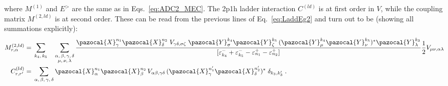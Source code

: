 where $M^{(1)}$ and $E^>$ are the same as in Eqs.~\eqref{eq:ADC2_MEC}. The 2p1h ladder interaction $C^{(ld)}$ is at first order in $V$, while the coupling matrix $ M^{(2,ld)}$ is at second order. These can be read from the previous lines of Eq.~\eqref{eq:LaddEg2} and turn out to be (showing all summations explicitly):
\begin{align}
M^{(2,ld)}_{r,\alpha} ={}&  \sum_{k_4, \, k_5} \quad \sum_{\substack{ \alpha ,\, \beta ,\, \gamma, \,  \delta \\ \mu ,\, \nu , \, \lambda}} 
  \frac{   \pazocal{X}^{n_1}_{\gamma} \pazocal{X}^{n_2}_{\delta} \;  V_{\gamma \delta, \sigma \zeta} \;
 \pazocal{Y}^{k_4}_{\sigma} \pazocal{Y}^{k_5}_{\zeta} \, (\pazocal{Y}^{k_4}_\mu \pazocal{Y}^{k_5}_\nu)^*  \pazocal{Y}^{k_3}_\lambda  }
                  {[\varepsilon^-_{k_4} + \varepsilon^-_{k_5} - \varepsilon^+_{n_1}  - \varepsilon^+_{n_2}]} \frac{1}{2} V_{\mu \nu, \alpha \lambda}
  \nonumber \\
  C^{(ld)}_{r,r'} ={}&  \sum_{ \alpha ,\, \beta ,\, \gamma ,\, \delta} \pazocal{X}^{n_1}_{\alpha} \pazocal{X}^{n_2}_{\beta}  \, V_{\alpha \beta, \gamma \delta} \, ( \pazocal{X}^{n_1'}_{\gamma} \pazocal{X}^{n_2'}_{\delta})^* \; \delta_{k_3, k_3'} \; .
\end{align}

